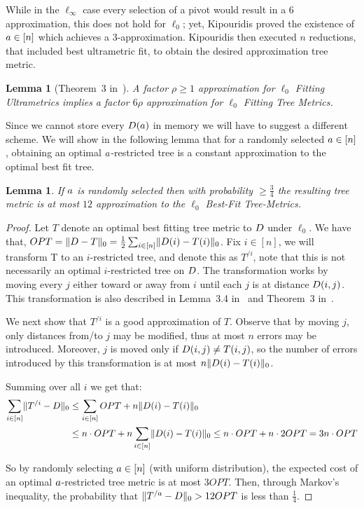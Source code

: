 \documentclass{article}
\newtheorem{lemma}[theorem]{Lemma}
\begin{document}
While in the $\ell_\infty$ case every selection of a pivot would result in a 6 approximation, this does not hold for $\ell_0$; yet, Kipouridis proved the existence of $a \in [n]$ which achieves a 3-approximation. Kipouridis then executed $n$ reductions, that included best ultrametric fit, to obtain the desired approximation tree metric. 

\begin{lemma}[Theorem~3 in~\cite{kipouridis2023fitting}]\label{lemma:best_tree_0}
A factor $\rho \geq 1$ approximation for $\ell_0$ Fitting Ultrametrics implies a factor $6\rho$
approximation for $\ell_0$ Fitting Tree Metrics.
\end{lemma}

Since we cannot store every $D(a)$ in memory we will have to suggest a different scheme.
We will show in the following lemma that for a randomly selected $a \in [n]$, obtaining an optimal  $a$-restricted tree is a constant approximation to the optimal best fit tree.

\begin{lemma}\label{lemma:l0_pivot}
If $a$ is randomly selected then with probability $\geq \frac{3}{4}$ the resulting tree metric is at most $12$ approximation to the $\ell_0$ Best-Fit Tree-Metrics.
\end{lemma}

\begin{proof}
Let $T$ denote an optimal best fitting tree metric to $D$ under $\ell_0$.
We have that, $OPT=\lVert D-T \rVert_0 = \frac{1}{2} \sum_{i\in [n]}\lVert D(i)-T(i) \rVert_0$.
Fix $i \in [n]$, we will transform T to an $i$-restricted tree, and denote this as $T^{/i}$, note that this is not necessarily an optimal $i$-restricted tree on $D$. The transformation works by moving every $j$ either toward or away from $i$ until each $j$ is at distance $D (i,j)$. This transformation is also described in Lemma~3.4 in~\cite{agarwala} and Theorem~3 in~\cite{kipouridis2023fitting}.

We next show that $T^{/i}$ is a good approximation of $T$. 
Observe that by moving $j$, only distances from/to $j$  may be modified, thus at most $n$ errors may be introduced. Moreover, $j$ is moved only if $D (i,j) \neq T (i,j)$, so the number of errors introduced by this transformation is at most $n \lVert D(i)-T(i) \rVert_0$.

Summing over all $i$ we get that:
\begin{align*}
\sum_{i\in [n]}\lVert T^{/i}-D \rVert_0 &\leq 
\sum_{i\in [n]} OPT + n \lVert D(i)-T(i) \rVert_0 \\
&\leq n\cdot OPT +n \sum_{i \in [n]}\lVert D(i)-T(i) \rVert_0 \leq n\cdot OPT +n \cdot 2OPT = 3n \cdot OPT
\end{align*}

So by randomly selecting $a \in [n]$ (with uniform distribution), the expected cost of an optimal $a$-restricted tree metric is at most $3OPT$. Then, through Markov's inequality, the probability that $\lVert T^{/a} - D \rVert_0 > 12OPT$ is less than $\frac{1}{4}$.
\end{proof}
\end{document}
